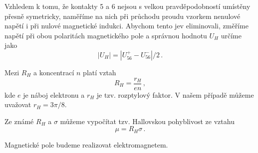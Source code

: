 Vzhledem k tomu, že kontakty 5 a 6 nejsou s velkou pravděpodobností umístěny přesně symetricky, naměříme na nich při průchodu proudu vzorkem nenulové napětí i při nulové magnetické indukci.
Abychom tento jev eliminovali, změříme napětí při obou polaritách magnetického pole a správnou hodnotu $U_H$ určíme jako
\begin{equation}
| U_H |=|U_{56}^+ - U_{56}^-|/2 \,.
\end{equation}

Mezi $R_H$ a koncentrací $n$ platí vztah \cite{skripta}
\begin{equation} \label{eq:koncentrace}
R_H = \frac{r_H}{en} \,,
\end{equation}
kde $e$ je náboj elektronu a $r_H$ je tzv. rozptylový faktor.
V našem případě můžeme uvažovat $r_H = 3\pi/8$. \cite{skripta}

Ze známé $R_H$ a $\sigma$ můžeme vypočítat tzv. Hallovskou pohyblivost ze vztahu \cite{skripta}
\begin{equation} \label{eq:pohyblivost}
\mu = R_H \sigma \,.
\end{equation}

Magnetické pole budeme realizovat elektromagnetem.